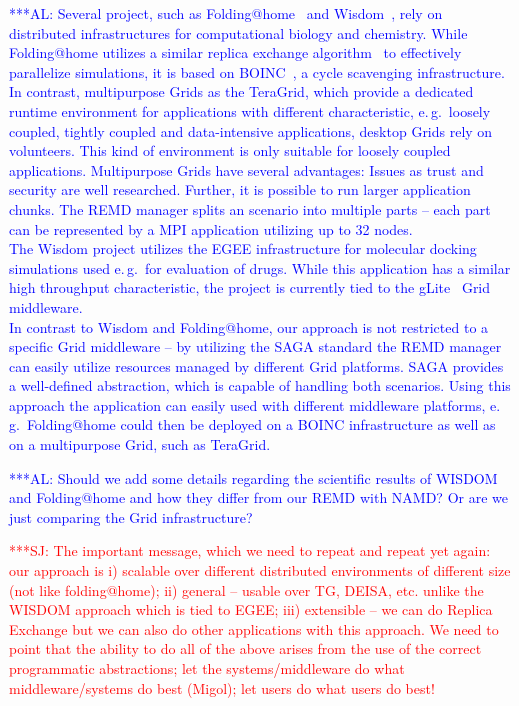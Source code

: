 \documentclass[times, 10pt,twocolumn]{article}
\newcommand{\alnote}[1]{ {\textcolor{blue} { ***AL: #1 }}}
\newcommand{\jhanote}[1]{ {\textcolor{red} { ***SJ: #1 }}}
\begin{document}
\alnote{Several project, such as Folding@home~\cite{folding} and Wisdom~\cite{wisdom}, rely on distributed infrastructures for computational biology and chemistry. While Folding@home utilizes a similar replica exchange algorithm~\cite{PhysRevLett.86.4983} 
to effectively parallelize simulations, it is based on BOINC~\cite{1033223}, a cycle scavenging infrastructure. 
In contrast, multipurpose Grids as the TeraGrid, which provide a dedicated runtime environment for applications with different characteristic, e.\,g.\ loosely coupled, tightly coupled and data-intensive applications, desktop Grids rely on volunteers. This kind of environment is only suitable for loosely coupled applications. Multipurpose Grids have several advantages: Issues as trust and security are well researched. Further, it is possible to run larger application chunks. The REMD manager splits an scenario into multiple parts -- each part can be represented by a MPI application utilizing up to 32 nodes. \\  
The Wisdom project utilizes the EGEE infrastructure for molecular docking simulations used e.\,g.\ for evaluation of drugs. While this application has a similar high throughput characteristic, the project is currently tied to the gLite~\cite{glite2008} Grid middleware.                      \\                             
In contrast to Wisdom and Folding@home, our approach is not restricted to a specific Grid middleware -- by utilizing the SAGA standard the REMD manager can easily utilize resources managed by different Grid platforms. SAGA provides a well-defined abstraction, which is capable of handling both scenarios. Using this approach the application can easily used with different middleware platforms, e.\,g.\ Folding@home could then be deployed on a BOINC infrastructure as well as on a multipurpose Grid, such as TeraGrid.                                                                                                                                                         
}

\alnote{Should we add some  details regarding  the scientific results of WISDOM and Folding@home and how they differ from
our REMD with NAMD? Or are we just comparing the Grid infrastructure?
}  
                       



\jhanote{The important message, which we need to repeat and repeat yet
  again: our approach is i) scalable over different distributed
  environments of different size (not like folding@home); ii) general
  -- usable over TG, DEISA, etc. unlike the WISDOM approach which is
  tied to EGEE; iii) extensible -- we can do Replica Exchange but we
  can also do other applications with this approach. We need to point
  that the ability to do all of the above arises from the use of the
  correct programmatic abstractions; let the systems/middleware do
  what middleware/systems do best (Migol); let users do what users do
  best!}
\end{document}
